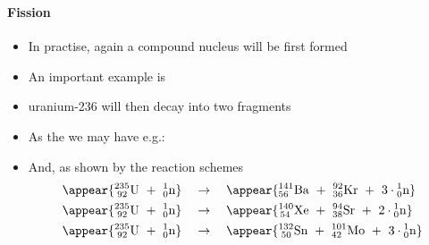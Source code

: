 \begin{frame}
\frametitle{\texorpdfstring{\culine[\sectiontitleulinecolor]{\sectiontitle}}{\sectiontitle} }
\framesubtitle{Fission}

\seminormal
\begin{itemize}[itemsep=1.5mm]
	\item In practise, again a compound nucleus will be first formed

\item An important example is 

\item  uranium-236 will then decay into two fragments 

\item As the  we may have e.g.: 

\item And, as shown by the reaction schemes
$$
\begin{aligned}
\appear{{ }_{\;92}^{235} \mathrm{U} ~ + ~ { }_{0}^{1} \mathrm{n} } \quad &\rightarrow \quad \appear{{ }_{56}^{141} \mathrm{Ba} ~ + ~ { }_{36}^{92} \mathrm{Kr} ~ + ~ 3\cdot{ }_{0}^{1} \mathrm{n} }\\
\appear{{ }_{\;92}^{235} \mathrm{U} ~ + ~ { }_{0}^{1} \mathrm{n}} \quad &\rightarrow \quad \appear{{ }_{\,54}^{140} \mathrm{Xe} ~ + ~ { }_{38}^{94} \mathrm{Sr} ~ + ~ 2\cdot{ }_{0}^{1} \mathrm{n}} \\
\appear{{ }^{235}_{\;92} \mathrm{U} ~ + ~ { }_{0}^{1} \mathrm{n}} \quad &\rightarrow \quad \appear{{ }_{\;50}^{132} \mathrm{Sn} ~ + ~ { }_{42}^{101} \mathrm{Mo} ~ + ~ 3\cdot{ }_{0}^{1} \mathrm{n}}
\end{aligned}
$$

\end{itemize}


\endofslide 
\end{frame}

